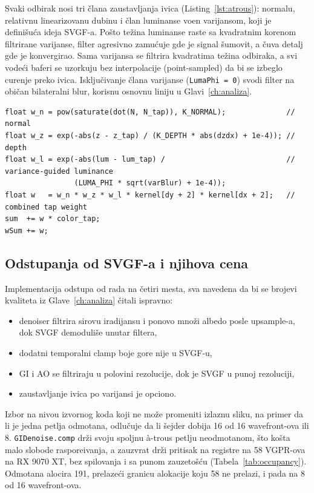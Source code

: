 Svaki odbirak nosi tri \v{c}lana zaustavljanja ivica (Listing~\ref{lst:atrous}): normalu, relativnu linearizovanu dubinu i \v{c}lan luminanse vo\dj{}en varijansom, koji je defini\v{s}u\'ca ideja SVGF-a. Po\v{s}to te\v{z}ina luminanse raste sa kvadratnim korenom filtrirane varijanse, filter agresivno zamu\'cuje gde je signal \v{s}umovit, a \v{c}uva detalj gde je konvergirao. Sama varijansa se filtrira kvadratima te\v{z}ina odbiraka, a svi vode\'ci baferi se uzorkuju bez interpolacije (point-sampled) da bi se izbeglo curenje preko ivica. Isklju\v{c}ivanje \v{c}lana varijanse (\texttt{LumaPhi = 0}) svodi filter na obi\v{c}an bilateralni blur, korisnu osnovnu liniju u Glavi~\ref{ch:analiza}.


\begin{lstlisting}[caption={Te\v{z}ine zaustavljanja ivica za \`a-trous filter (SVGF jezgro, HLSL).}, label={lst:atrous}]
float w_n = pow(saturate(dot(N, N_tap)), K_NORMAL);              // normal
float w_z = exp(-abs(z - z_tap) / (K_DEPTH * abs(dzdx) + 1e-4)); // depth
float w_l = exp(-abs(lum - lum_tap) /                            // variance-guided luminance
                (LUMA_PHI * sqrt(varBlur) + 1e-4));
float w   = w_n * w_z * w_l * kernel[dy + 2] * kernel[dx + 2];   // combined tap weight
sum  += w * color_tap;
wSum += w;
\end{lstlisting}

\subsection{Odstupanja od SVGF-a i njihova cena}

Implementacija odstupa od rada na \v{c}etiri mesta, sva navedena da bi se brojevi kvaliteta iz Glave~\ref{ch:analiza} \v{c}itali ispravno:
\begin{itemize}
\item denoiser filtrira sirovu iradijansu i ponovo mno\v{z}i albedo posle upsample-a, dok SVGF demoduli\v{s}e unutar filtera,
\item dodatni temporalni clamp boje gore nije u SVGF-u,
\item GI i AO se filtriraju u polovini rezolucije, dok je SVGF u punoj rezoluciji,
\item zaustavljanje ivica po varijansi je opciono.
\end{itemize}

Izbor na nivou izvornog koda koji ne mo\v{z}e promeniti izlaznu sliku, na primer da li je jedna petlja odmotana, odlu\v{c}uje da li \v{s}ejder dobija 16 od 16 wavefront-ova ili 8. \texttt{GIDenoise.comp} dr\v{z}i svoju spoljnu \`a-trous petlju neodmotanom, \v{s}to ko\v{s}ta malo slobode raspore\dj{}ivanja, a zauzvrat dr\v{z}i pritisak na registre na 58 VGPR-ova na RX 9070 XT, bez spilovanja i sa punom zauzeto\v{s}\'cu (Tabela~\ref{tab:occupancy}). Odmotana alocira 191, prelaze\'ci granicu alokacije koju 58 ne prelazi, i pada na 8 od 16 wavefront-ova.

